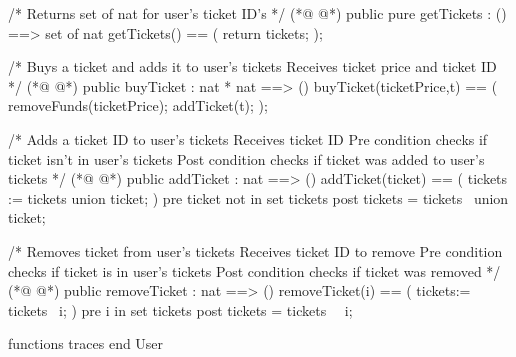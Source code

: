 \begin{vdmpp}[breaklines=true]
 /*
  Returns set of nat for user's ticket ID's
 */
(*@
\label{getTickets:99}
@*)
 public pure getTickets : () ==> set of nat
  getTickets() == (
  return tickets;
 );
 
 /*
  Buys a ticket and adds it to user's tickets
  Receives ticket price and ticket ID
 */
(*@
\label{buyTicket:108}
@*)
 public buyTicket : nat * nat ==> ()
 buyTicket(ticketPrice,t) == (
  removeFunds(ticketPrice);
  addTicket(t);
 );
 
 /*
  Adds a ticket ID to user's tickets
  Receives ticket ID
  Pre condition checks if ticket isn't in user's tickets
  Post condition checks if ticket was added to user's tickets
 */
(*@
\label{addTicket:120}
@*)
 public addTicket : nat ==> ()
 addTicket(ticket) == (
  tickets := tickets union {ticket};
 )
 pre ticket not in set tickets
 post tickets = tickets~ union {ticket};
 
 /*
  Removes ticket from user's tickets
  Receives ticket ID to remove
  Pre condition checks if ticket is in user's tickets
  Post condition checks if ticket was removed
 */
(*@
\label{removeTicket:133}
@*)
 public removeTicket : nat ==> ()
 removeTicket(i) == (
  tickets:= tickets \ {i}; 
 )
 pre i in set tickets
 post tickets = tickets~ \ {i}; 
 
functions
traces
end User
\end{vdmpp}
